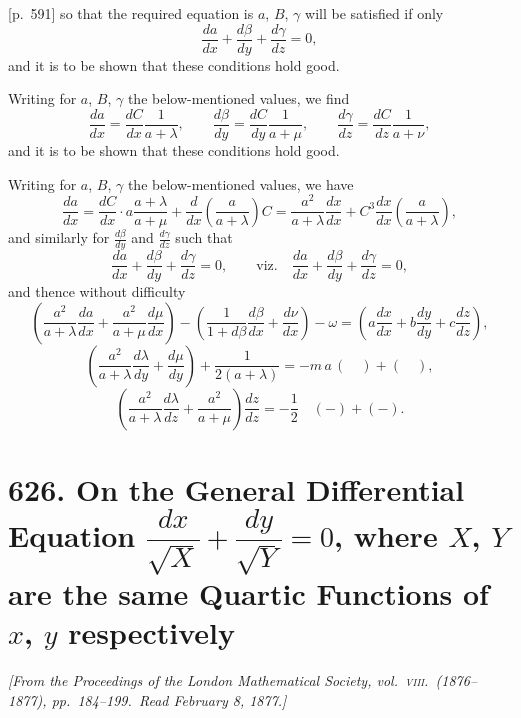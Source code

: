 \documentclass[11pt,a4paper]{article}
\theoremstyle{plain}
\theoremstyle{definition}
\theoremstyle{remark}
\begin{document}
\bigskip

[p.~591] so that the required equation is $a$, $B$, $\gamma$ will be satisfied if only
\[
\frac{da}{dx} + \frac{d\beta}{dy} + \frac{d\gamma}{dz} = 0,
\]
and it is to be shown that these conditions hold good.

Writing for $a$, $B$, $\gamma$ the below-mentioned values, we find
\[
\frac{da}{dx} = \frac{dC}{dx} \frac{1}{a + \lambda}, \qquad \frac{d\beta}{dy} = \frac{dC}{dy} \frac{1}{a + \mu}, \qquad \frac{d\gamma}{dz} = \frac{dC}{dz} \frac{1}{a + \nu},
\]
and it is to be shown that these conditions hold good.

Writing for $a$, $B$, $\gamma$ the below-mentioned values, we have
\[
\frac{da}{dx} = \frac{dC}{dx} \cdot a \frac{a + \lambda}{a + \mu} + \frac{d}{dx}\left(\frac{a}{a + \lambda}\right) C = \frac{a^2}{a + \lambda} \frac{dx}{dx} + C^3 \frac{dx}{dx} \left(\frac{a}{a + \lambda}\right),
\]
and similarly for $\frac{d\beta}{dy}$ and $\frac{d\gamma}{dz}$ such that
\[
\frac{da}{dx} + \frac{d\beta}{dy} + \frac{d\gamma}{dz} = 0, \qquad \text{viz.}\quad \frac{da}{dx} + \frac{d\beta}{dy} + \frac{d\gamma}{dz} = 0,
\]
and thence without difficulty
\[
\left(\frac{a^2}{a+\lambda} \frac{da}{dx} + \frac{a^2}{a+\mu} \frac{d\mu}{dx} \right) - \left(\frac{1}{1 + d\beta}\frac{d\beta}{dx} + \frac{d\nu}{dx}\right) - \omega = \left(a\frac{dx}{dx} + b\frac{dy}{dy} + c\frac{dz}{dz}\right),
\]
\[
\left(\frac{a^2}{a+\lambda} \frac{d\lambda}{dy} + \frac{d\mu}{dy}\right) + \frac{1}{2(a+\lambda)} = -m\,a\,\left( \quad \right) + \left( \quad \right),
\]
\[
\left(\frac{a^2}{a+\lambda} \frac{d\lambda}{dz} + \frac{a^2}{a+\mu}\right) \frac{dz}{dz} = -\frac{1}{2} \quad ( - ) + ( - ).
\]

\bigskip

\newpage
\section*{\textbf{626.} On the General Differential Equation $\dfrac{dx}{\sqrt{X}} + \dfrac{dy}{\sqrt{Y}} = 0$, where $X$, $Y$ are the same Quartic Functions of $x$, $y$ respectively}

\textit{[From the Proceedings of the London Mathematical Society, vol.\ \textsc{viii}.\ (1876--1877), pp.~184--199.\ Read February 8, 1877.]}
\end{document}
